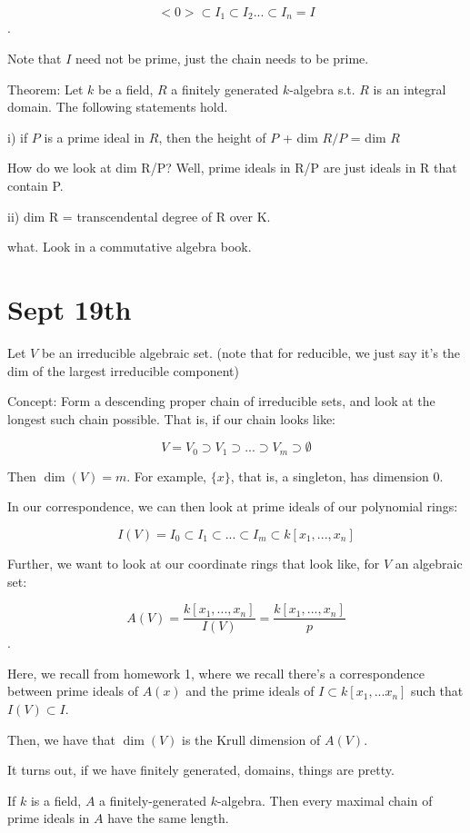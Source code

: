 \documentclass[10pt]{article}
\begin{document}
$$ <0> \subset I_1 \subset I_2 ... \subset I_n = I$$.

Note that $I$ need not be prime, just the chain needs to be prime.

Theorem: Let $k$ be a field, $R$ a finitely generated $k$-algebra s.t. $R$ is an integral domain. The following statements hold.

i) if $P$ is a prime ideal in $R$, then the height of $P$ + dim $R/P$ = dim $R$

How do we look at dim R/P? Well, prime ideals in R/P are just ideals in R that contain P.


ii) dim R = transcendental degree of R over K.

what. Look in a commutative algebra book.

\section{Sept 19th}

Let $V$ be an irreducible algebraic set. (note that for reducible, we just say it’s the dim of the largest irreducible component)

Concept: Form a descending proper chain of irreducible sets, and look at the longest such chain possible. That is, if our chain looks like:

$$ V = V_0 \supset V_1 \supset ... \supset V_m \supset \emptyset$$

Then $\dim(V) = m$. For example, $\{x \}$, that is, a singleton, has dimension 0.

In our correspondence, we can then look at prime ideals of our polynomial rings:

$$ I(V) = I_0 \subset I_1 \subset ... \subset I_m \subset k[x_1,...,x_n]$$

Further, we want to look at our coordinate rings that look like, for $V$ an algebraic set:

$$A(V) = \frac{k[x_1,...,x_n]}{I(V)} = \frac{k[x_1,...,x_n]}{p} $$.

Here, we recall from homework 1, where we recall there’s a correspondence between prime ideals of $A(x)$ and the prime ideals of $I \subset k[x_1,...x_n]$ such that $I(V) \subset I$.

Then, we have that $\dim(V)$ is the Krull dimension of $A(V)$.

It turns out, if we have finitely generated, domains, things are pretty.

If $k$ is a field, $A$ a finitely-generated $k$-algebra. Then every maximal chain of prime ideals in $A$ have the same length.
\end{document}
